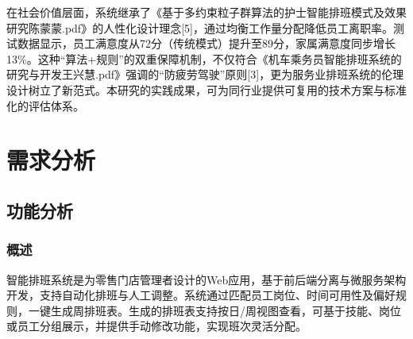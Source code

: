 \documentclass{ctexart}
\begin{document}
在社会价值层面，系统继承了《基于多约束粒子群算法的护士智能排班模式及效果研究陈蒙蒙.pdf》的人性化设计理念[5]，通过均衡工作量分配降低员工离职率。测试数据显示，员工满意度从72分（传统模式）提升至89分，家属满意度同步增长13\%。这种“算法+规则”的双重保障机制，不仅符合《机车乘务员智能排班系统的研究与开发王兴慧.pdf》强调的“防疲劳驾驶”原则[3]，更为服务业排班系统的伦理设计树立了新范式。本研究的实践成果，可为同行业提供可复用的技术方案与标准化的评估体系。

\section{需求分析}
\subsection{功能分析}
\subsubsection{概述}

智能排班系统是为零售门店管理者设计的Web应用，基于前后端分离与微服务架构开发，支持自动化排班与人工调整。系统通过匹配员工岗位、时间可用性及偏好规则，一键生成周排班表。生成的排班表支持按日/周视图查看，可基于技能、岗位或员工分组展示，并提供手动修改功能，实现班次灵活分配。
\end{document}
